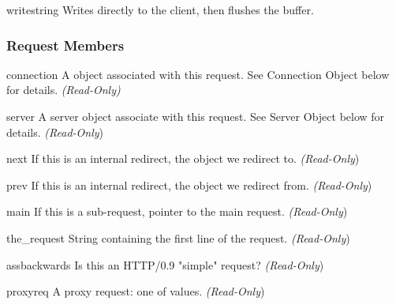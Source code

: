 \begin{methoddesc}[Request]{write}{string}
Writes  directly to the client, then flushes the buffer. 
\end{methoddesc}

\subsubsection{Request Members\label{pyapi-mprequest-mem}}

\begin{memberdesc}[Request]{connection}
A  object associated with this request. See
Connection Object below for details.
\emph{(Read-Only)}
\end{memberdesc}

\begin{memberdesc}[Request]{server}
A server object associate with this request. See Server Object below
for details.
\emph{(Read-Only})
\end{memberdesc}

\begin{memberdesc}[Request]{next}
If this is an internal redirect, the  object we redirect to. 
\emph{(Read-Only})
\end{memberdesc}

\begin{memberdesc}[Request]{prev}
If this is an internal redirect, the  object we redirect from.
\emph{(Read-Only})
\end{memberdesc}

\begin{memberdesc}[Request]{main}
If this is a sub-request, pointer to the main request. 
\emph{(Read-Only})
\end{memberdesc}

\begin{memberdesc}[Request]{the_request}
String containing the first line of the request.
\emph{(Read-Only})
\end{memberdesc}

\begin{memberdesc}[Request]{assbackwards}
Is this an HTTP/0.9 "simple" request? 
\emph{(Read-Only})
\end{memberdesc}

\begin{memberdesc}[Request]{proxyreq}
A proxy request: one of  values.
\emph{(Read-Only})
\end{memberdesc}

